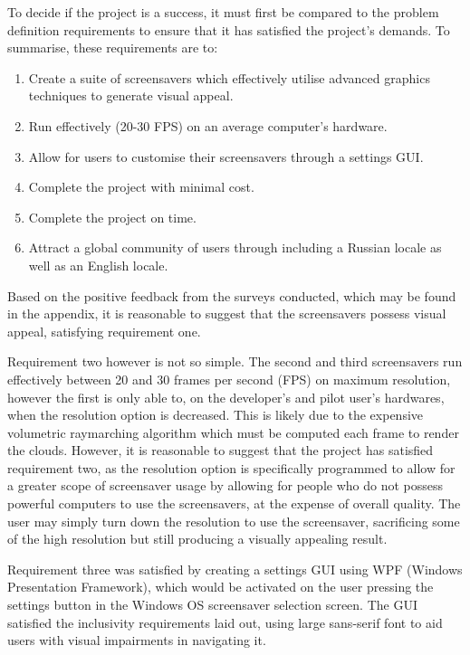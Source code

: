 \documentclass[10pt, openany]{book}
\begin{document}
To decide if the project is a success, it must first be compared to the problem definition requirements to ensure that it has satisfied the project's demands. To summarise, these requirements are to:
\begin{enumerate}
	\item Create a suite of screensavers which effectively utilise advanced graphics techniques to generate visual appeal.
	\item Run effectively (20-30 FPS) on an average computer's hardware.
	\item Allow for users to customise their screensavers through a settings GUI.
	\item Complete the project with minimal cost.
	\item Complete the project on time.
	\item Attract a global community of users through including a Russian locale as well as an English locale.
\end{enumerate}

Based on the positive feedback from the surveys conducted, which may be found in the appendix, it is reasonable to suggest that the screensavers possess visual appeal, satisfying requirement one.

Requirement two however is not so simple. The second and third screensavers run effectively between 20 and 30 frames per second (FPS) on maximum resolution, however the first is only able to, on the developer's and pilot user's hardwares, when the resolution option is decreased. This is likely due to the expensive volumetric raymarching algorithm which must be computed each frame to render the clouds. However, it is reasonable to suggest that the project has satisfied requirement two, as the resolution option is specifically programmed to allow for a greater scope of screensaver usage by allowing for people who do not possess powerful computers to use the screensavers, at the expense of overall quality. The user may simply turn down the resolution to use the screensaver, sacrificing some of the high resolution but still producing a visually appealing result.

Requirement three was satisfied by creating a settings GUI using WPF (Windows Presentation Framework), which would be activated on the user pressing the settings button in the Windows OS screensaver selection screen. The GUI satisfied the inclusivity requirements laid out, using large sans-serif font to aid users with visual impairments in navigating it. 
\end{document}
